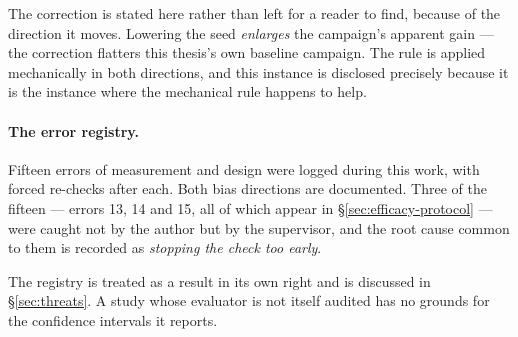 The correction is stated here rather than left for a reader to find,
because of the direction it moves. Lowering the seed \emph{enlarges} the
campaign's apparent gain --- the correction flatters this thesis's own
baseline campaign. The rule is applied mechanically in both directions, and
this instance is disclosed precisely because it is the instance where the
mechanical rule happens to help.

\paragraph{The error registry.} Fifteen errors of measurement and design
were logged during this work, with forced re-checks after each. Both bias
directions are documented. Three of the fifteen --- errors 13, 14 and 15,
all of which appear in \S\ref{sec:efficacy-protocol} --- were caught not by
the author but by the supervisor, and the root cause common to them is
recorded as \emph{stopping the check too early}.

The registry is treated as a result in its own right and is discussed in
\S\ref{sec:threats}. A study whose evaluator is not itself audited has no
grounds for the confidence intervals it reports.
